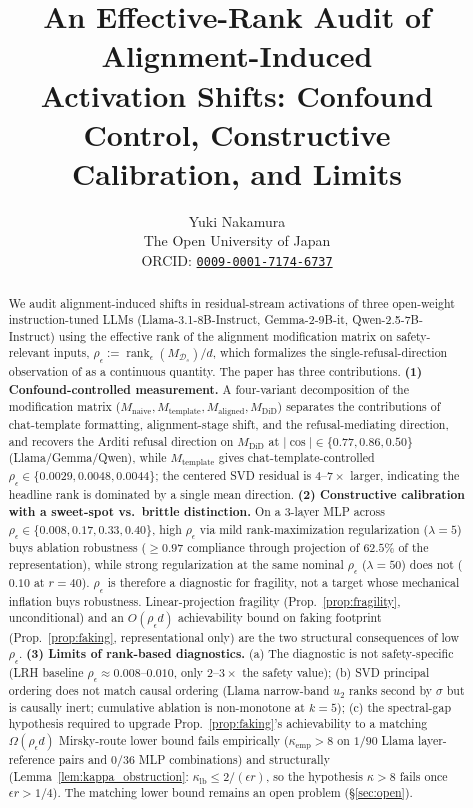 \documentclass[10pt]{article}
\title{An Effective-Rank Audit of Alignment-Induced\\
  Activation Shifts: Confound Control, Constructive\\
  Calibration, and Limits}
\author{\name Yuki Nakamura \\
        \addr The Open University of Japan \\
        \addr ORCID: \texttt{\href{https://orcid.org/0009-0001-7174-6737}{0009-0001-7174-6737}}}
\theoremstyle{definition}
\theoremstyle{remark}
\begin{document}
\maketitle

\begin{abstract}
We audit alignment-induced shifts in residual-stream
activations of three open-weight instruction-tuned LLMs
(Llama-3.1-8B-Instruct, Gemma-2-9B-it,
Qwen-2.5-7B-Instruct) using the effective rank of the
alignment modification matrix on safety-relevant inputs,
$\rho_{\epsilon} :=
\operatorname{rank}_{\epsilon}(M_{\mathcal{D}_s})/d$,
which formalizes the single-refusal-direction
observation of \citet{arditi2024refusal} as a continuous
quantity.  The paper has three contributions.
\textbf{(1) Confound-controlled measurement.}  A
four-variant decomposition of the modification matrix
($M_{\mathrm{naive}}, M_{\mathrm{template}},
M_{\mathrm{aligned}}, M_{\mathrm{DiD}}$) separates the
contributions of chat-template formatting, alignment-stage
shift, and the refusal-mediating direction, and recovers
the Arditi
refusal direction on $M_{\mathrm{DiD}}$ at
$|\cos|\in\{0.77, 0.86, 0.50\}$ (Llama/Gemma/Qwen),
while $M_{\mathrm{template}}$ gives chat-template-controlled
$\rho_{\epsilon}\in\{0.0029, 0.0048, 0.0044\}$; the
centered SVD residual is $4$--$7\times$ larger,
indicating the headline rank is dominated by a single
mean direction.
\textbf{(2) Constructive calibration with a sweet-spot
vs.\ brittle distinction.}  On a 3-layer MLP across
$\rho_{\epsilon}\in\{0.008, 0.17, 0.33, 0.40\}$, high
$\rho_{\epsilon}$ via mild rank-maximization
regularization ($\lambda=5$) buys ablation robustness
($\geq 0.97$ compliance through projection of $62.5\%$
of the representation), while strong regularization at
the same nominal $\rho_{\epsilon}$ ($\lambda=50$) does
not ($0.10$ at $r=40$).  $\rho_{\epsilon}$ is therefore
a diagnostic for fragility, not a target whose
mechanical inflation buys robustness.  Linear-projection
fragility (Prop.~\ref{prop:fragility}, unconditional)
and an $O(\rho_{\epsilon}d)$ achievability bound on
faking footprint (Prop.~\ref{prop:faking},
representational only) are the two structural
consequences of low $\rho_{\epsilon}$.
\textbf{(3) Limits of rank-based diagnostics.}
(a) The diagnostic is not safety-specific (LRH baseline
$\rho_{\epsilon}\approx 0.008$--$0.010$, only
$2$--$3\times$ the safety value); (b) SVD principal
ordering does not match causal ordering (Llama
narrow-band $u_2$ ranks second by $\sigma$ but is
causally inert; cumulative ablation is non-monotone at
$k{=}5$); (c) the spectral-gap hypothesis required to
upgrade Prop.~\ref{prop:faking}'s achievability to a
matching $\Omega(\rho_{\epsilon}d)$ Mirsky-route lower
bound fails empirically ($\kappa_{\mathrm{emp}}>8$ on
$1/90$ Llama layer-reference pairs and $0/36$ MLP
combinations) and structurally
(Lemma~\ref{lem:kappa_obstruction}:
$\kappa_{\mathrm{lb}}\leq 2/(\epsilon r)$, so the
hypothesis $\kappa>8$ fails once $\epsilon r > 1/4$).
The matching lower bound remains an open problem
(\S\ref{sec:open}).
\end{abstract}
\end{document}
